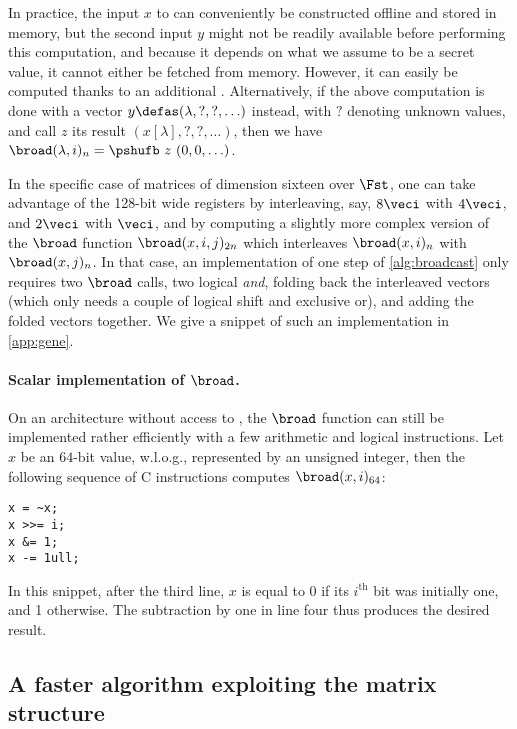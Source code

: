 In practice, the input $x$ to \pshufb{} can conveniently be constructed offline and stored in memory, but the second input $y$ might not be readily available before
performing this computation, and because it depends on what we assume to be a secret value, it cannot either be fetched from memory.
However, it can easily be computed thanks to an additional \pshufb{}. Alternatively, if the
above computation is done with a vector $y \defas (\lambda, ?, ?, \ldots)$ instead, with $?$ denoting unknown values, and call $z$ its result $(x[\lambda], ?, ?, \ldots)$,
then we have $\broad(\lambda, i)_n = \pshufb~z~ (0, 0, \ldots)$.

\medskip

In the specific case of matrices of dimension sixteen over $\Fst$, one can take advantage of the 128-bit
wide \xmm{} registers by interleaving, say, $8\veci$ with $4\veci$, and $2\veci$ with $\veci$, and by computing a slightly more
complex version of the $\broad$ function $\broad(x,i,j)_{2n}$ which interleaves $\broad(x,i)_n$ with $\broad(x,j)_n$.
In that case, an implementation of one step of \autoref{alg:broadcast} only requires two $\broad$ calls, two logical \emph{and}, folding back the interleaved vectors
(which only needs a couple of logical shift and exclusive or), and adding the folded vectors together.
We give a snippet of such an implementation in \autoref{app:gene}.

\paragraph{Scalar implementation of $\broad$.}
On an architecture without access to \pshufb, the $\broad$ function can still be implemented rather efficiently with a few arithmetic and logical instructions.
Let $x$ be an $64$-bit value, w.l.o.g., represented by an unsigned integer, then the following sequence of C instructions computes $\broad(x,i)_{64}$:
\begin{center}
\begin{verbatim}
x = ~x;
x >>= i;
x &= 1;
x -= 1ull;
\end{verbatim}
\end{center}
In this snippet, after the third line, $x$ is equal to 0 if its $i^\text{th}$ bit was initially one, and 1 otherwise. The subtraction by one in line four thus produces the desired result.

\subsection{A faster algorithm exploiting the matrix structure}
\label{shuff}

